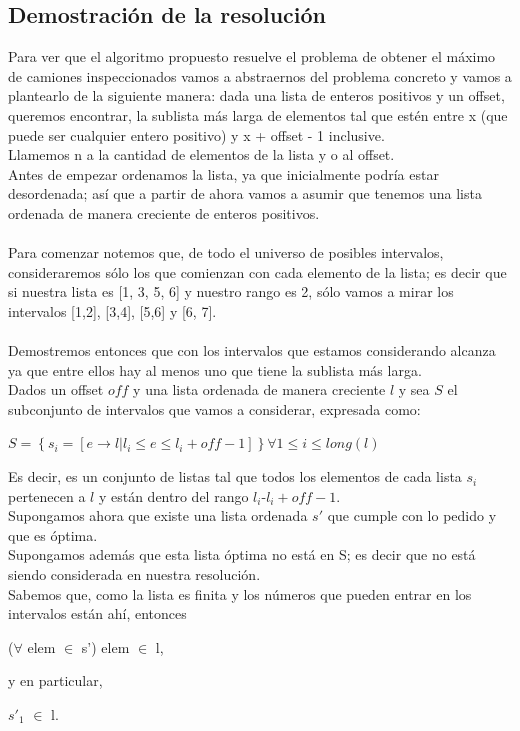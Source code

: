 \subsection{Demostraci\'on de la resoluci\'on}

Para ver que el algoritmo propuesto resuelve el problema de obtener el m\'aximo de camiones inspeccionados vamos a abstraernos del problema concreto y vamos a plantearlo de la siguiente manera: dada una lista de enteros positivos y un offset, queremos encontrar, la sublista m\'as larga de elementos tal que est\'en entre x (que puede ser cualquier entero positivo) y x + offset - 1 inclusive.\\

Llamemos n a la cantidad de elementos de la lista y o al offset.\\
Antes de empezar ordenamos la lista, ya que inicialmente podr\'ia estar desordenada; as\'i que a partir de ahora vamos a asumir que tenemos una lista ordenada de manera creciente de enteros positivos. \\ \\

Para comenzar notemos que, de todo el universo de posibles intervalos, consideraremos s\'olo los que comienzan con cada elemento de la lista; es decir que si nuestra lista es [1, 3, 5, 6] y nuestro rango es 2, s\'olo vamos a mirar los intervalos [1,2], [3,4], [5,6] y [6, 7].\\ \\

Demostremos entonces que con los intervalos que estamos considerando alcanza ya que entre ellos hay al menos uno que tiene la sublista m\'as larga.\\
Dados un offset $off$ y una lista ordenada de manera creciente $l$ y sea $S$ el subconjunto de intervalos que vamos a considerar, expresada como: \\
\begin{center}
$ S = \left\lbrace s_i = \left[ e \rightarrow l | l_i \leq e \leq l_i + off - 1 \right] \right\rbrace \forall 1 \leq i \leq long(l) $ 
\end{center}
Es decir, es un conjunto de listas tal que todos los elementos de cada lista $s_i$ pertenecen a $l$ y est\'an dentro del rango $l_i$-$l_i + off - 1$. \\
Supongamos ahora que existe una lista ordenada $s'$ que cumple con lo pedido y que es \'optima.\\
Supongamos adem\'as que esta lista \'optima no est\'a en S; es decir que no est\'a siendo considerada en nuestra resoluci\'on.\\
Sabemos que, como la lista es finita y los n\'umeros que pueden entrar en los intervalos est\'an ah\'i, entonces \\
\begin{center}
($\forall$ elem $\in$ s') elem $\in$ l, \\
\end{center}
y en particular, \\
\begin{center}
$s'_1$ $\in$ l. \\
\end{center}

